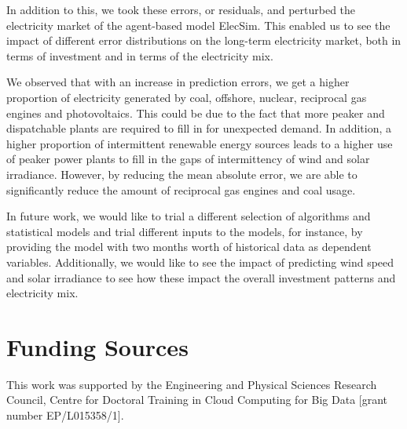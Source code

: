 \documentclass[final,3p,times,twocolumn,numbers]{elsarticle}
\begin{document}
In addition to this, we took these errors, or residuals, and perturbed the electricity market of the agent-based model ElecSim. This enabled us to see the impact of different error distributions on the long-term electricity market, both in terms of investment and in terms of the electricity mix.

We observed that with an increase in prediction errors, we get a higher proportion of electricity generated by coal, offshore, nuclear, reciprocal gas engines and photovoltaics. This could be due to the fact that more peaker and dispatchable plants are required to fill in for unexpected demand. In addition, a higher proportion of intermittent renewable energy sources leads to a higher use of peaker power plants to fill in the gaps of intermittency of wind and solar irradiance. However, by reducing the mean absolute error, we are able to significantly reduce the amount of reciprocal gas engines and coal usage.

In future work, we would like to trial a different selection of algorithms and statistical models and trial different inputs to the models, for instance, by providing the model with two months worth of historical data as dependent variables. Additionally, we would like to see the impact of predicting wind speed and solar irradiance to see how these impact the overall investment patterns and electricity mix. 


\section{Funding Sources}

This work was supported by the Engineering and Physical Sciences Research Council, Centre for Doctoral Training in Cloud Computing for Big Data [grant number EP/L015358/1].







   
  


%
%
%
\end{document}
